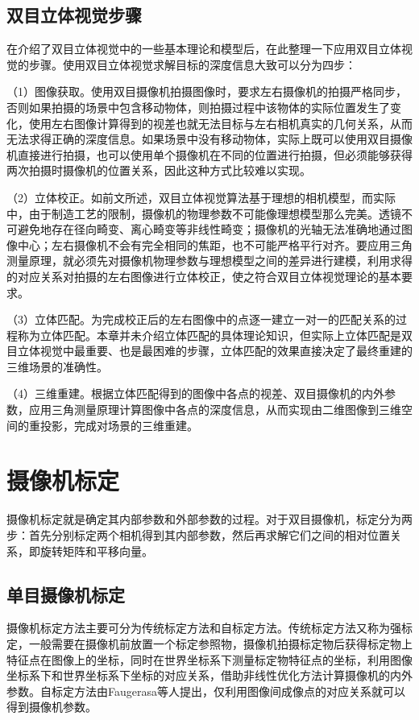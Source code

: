 \subsection{双目立体视觉步骤}
在介绍了双目立体视觉中的一些基本理论和模型后，在此整理一下应用双目立体视觉的步骤。使用双目立体视觉求解目标的深度信息大致可以分为四步：

（1）图像获取。使用双目摄像机拍摄图像时，要求左右摄像机的拍摄严格同步，否则如果拍摄的场景中包含移动物体，则拍摄过程中该物体的实际位置发生了变化，使用左右图像计算得到的视差也就无法目标与左右相机真实的几何关系，从而无法求得正确的深度信息。如果场景中没有移动物体，实际上既可以使用双目摄像机直接进行拍摄，也可以使用单个摄像机在不同的位置进行拍摄，但必须能够获得两次拍摄时摄像机的位置关系，因此这种方式比较难以实现。

（2）立体校正。如前文所述，双目立体视觉算法基于理想的相机模型，而实际中，由于制造工艺的限制，摄像机的物理参数不可能像理想模型那么完美。透镜不可避免地存在径向畸变、离心畸变等非线性畸变；摄像机的光轴无法准确地通过图像中心；左右摄像机不会有完全相同的焦距，也不可能严格平行对齐。要应用三角测量原理，就必须先对摄像机物理参数与理想模型之间的差异进行建模，利用求得的对应关系对拍摄的左右图像进行立体校正，使之符合双目立体视觉理论的基本要求。

（3）立体匹配。为完成校正后的左右图像中的点逐一建立一对一的匹配关系的过程称为立体匹配。本章并未介绍立体匹配的具体理论知识，但实际上立体匹配是双目立体视觉中最重要、也是最困难的步骤，立体匹配的效果直接决定了最终重建的三维场景的准确性。

（4）三维重建。根据立体匹配得到的图像中各点的视差、双目摄像机的内外参数，应用三角测量原理计算图像中各点的深度信息，从而实现由二维图像到三维空间的重投影，完成对场景的三维重建。


\section{摄像机标定}
摄像机标定就是确定其内部参数和外部参数的过程。对于双目摄像机，标定分为两步：首先分别标定两个相机得到其内部参数，然后再求解它们之间的相对位置关系，即旋转矩阵和平移向量。

\subsection{单目摄像机标定}
摄像机标定方法主要可分为传统标定方法和自标定方法。传统标定方法\cite{李小平2008双目视觉立体测量研究}又称为强标定，一般需要在摄像机前放置一个标定参照物，摄像机拍摄标定物后获得标定物上特征点在图像上的坐标，同时在世界坐标系下测量标定物特征点的坐标，利用图像坐标系下和世界坐标系下坐标的对应关系，借助非线性优化方法计算摄像机的内外参数\cite{时洪光2010基于双目视觉的运动目标定位研究}。自标定方法\cite{李洪海2007摄像机标定技术研究}由Faugerasa等人提出，仅利用图像间成像点的对应关系就可以得到摄像机参数\cite{王德海2016基于双目立体视觉的目标识别与抓取定位}。

